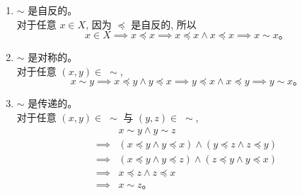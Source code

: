\documentclass[a4paper, justified]{tufte-handout}
\begin{document}
\begin{solution}
  \begin{enumerate}[(1)]
    \item $\sim$ 是自反的。\\
      对于任意 $x \in X$, 因为 $\preceq$ 是自反的, 所以
      \[
        x \in X \implies x \preceq x \implies x \preceq x \land x \preceq x
        \implies x \sim x\text{。}
      \]
    \item $\sim$ 是对称的。\\
      对于任意 $(x, y) \in \;\sim$,
      \[
        x \sim y \implies x \preceq y \land y \preceq x
        \implies y \preceq x \land x \preceq y \implies y \sim x\text{。}
      \]
    \item $\sim$ 是传递的。\\
      对于任意 $(x, y) \in \;\sim$ 与 $(y, z) \in \;\sim$,
      \begin{align*}
        & x \sim y \land y \sim z \\[6pt]
        \implies & (x \preceq y \land y \preceq x) \land (y \preceq z \land z \preceq y) \\[6pt]
        \implies & (x \preceq y \land y \preceq z) \land (z \preceq y \land y \preceq x) \\[6pt]
        \implies & x \preceq z \land z \preceq x \qquad \\[6pt]
        \implies & x \sim z\text{。}
      \end{align*}
  \end{enumerate}
\end{solution}




\end{document}
